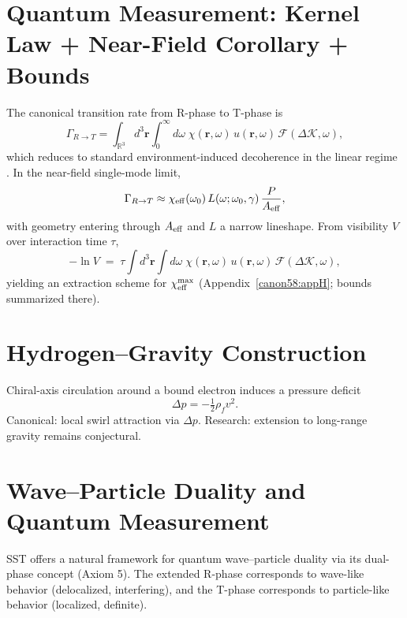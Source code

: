 \documentclass[reprint,aps,onecolumn,nofootinbib]{revtex4-2}
\newcommand{\rhof}{\rho_{\!f}}                           %
\begin{document}
    \section{Quantum Measurement: Kernel Law + Near-Field Corollary + Bounds}\label{canon58:measurement}
    The canonical transition rate from R-phase to T-phase is
    \begin{equation}
    \Gamma_{R\to T}
    =\int_{\mathbb{R}^3}\! d^3\mathbf r \int_{0}^{\infty}\! d\omega\;
    \chi(\mathbf r,\omega)\,u(\mathbf r,\omega)\,\mathcal F(\Delta\mathcal K,\omega),
    \label{eq:kernel}
    \end{equation}
    which reduces to standard environment-induced decoherence in the linear regime \cite{Zurek2003}.
    In the near-field single-mode limit,
    \[
        \Gamma_{R\to T}\approx \chi_{\rm eff}(\omega_0)\,L(\omega;\omega_0,\gamma)\,\frac{P}{A_{\rm eff}},
    \]
    with geometry entering through $A_{\rm eff}$ and $L$ a narrow lineshape. From visibility $V$ over interaction time $\tau$,
    \[
        -\ln V \;=\; \tau \int d^3\mathbf r \int d\omega\;\chi(\mathbf r,\omega)\,u(\mathbf r,\omega)\,\mathcal F(\Delta\mathcal K,\omega),
    \]
    yielding an extraction scheme for $\chi_{\rm eff}^{\max}$ (Appendix~\ref{canon58:appH}; bounds summarized there). %



    \section{Hydrogen--Gravity Construction}\label{canon58:hydro-grav}
    Chiral-axis circulation around a bound electron induces a pressure deficit
    \[
        \Delta p = -\tfrac12 \rhof v^2.
    \]
    Canonical: local swirl attraction via $\Delta p$. %
    Research: extension to long-range gravity remains conjectural. %


	\section{Wave–Particle Duality and Quantum Measurement}
	SST offers a natural framework for quantum wave–particle duality via its dual-phase concept (Axiom 5). The extended R-phase corresponds to wave-like behavior (delocalized, interfering), and the T-phase corresponds to particle-like behavior (localized, definite).
\end{document}
